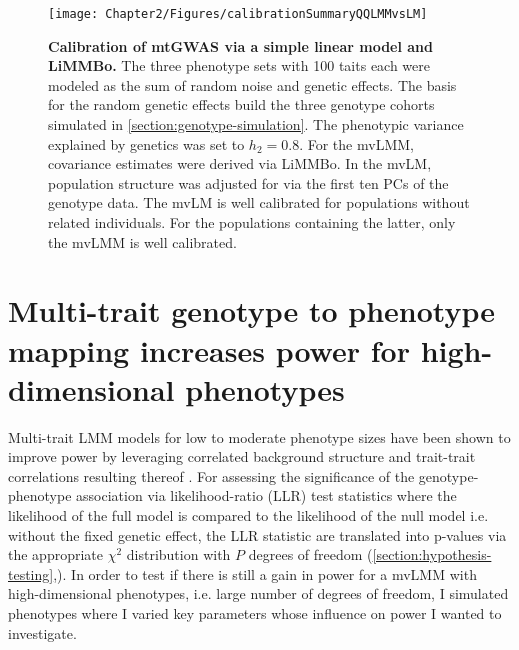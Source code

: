 \begin{figure}[hbtp]
	\centering	
	\texttt{[image: Chapter2/Figures/calibrationSummaryQQLMMvsLM]}\\
	\caption[\textbf{Calibration of mtGWAS via a simple linear model and a linear mixed model. }]{\textbf{Calibration of mtGWAS via a simple linear model and LiMMBo. } The three phenotype sets with \num{100} taits each were modeled as the sum of random noise and genetic effects. The basis for the random genetic effects build the three genotype cohorts simulated in \cref{section:genotype-simulation}. The phenotypic variance explained by genetics was set to \(h_2=0.8\). For the mvLMM,  covariance estimates were derived via LiMMBo. In the mvLM, population structure was adjusted for via the first ten PCs of the genotype data. The mvLM is well calibrated for populations without related individuals. For the populations containing the latter, only the mvLMM is well calibrated. }
	  \label{fig:calibration-LM}%
\end{figure}

\section{Multi-trait genotype to phenotype mapping increases power for high-dimensional phenotypes}
\label{section:power-limmbo}

Multi-trait LMM models for low to moderate phenotype sizes have been shown to improve power by leveraging correlated background structure and trait-trait correlations resulting thereof \cite{Casale2015}. For assessing the significance of the genotype-phenotype association via likelihood-ratio (LLR) test statistics where the likelihood of the full model is compared to the likelihood of the null model i.e. without the fixed genetic effect, the LLR statistic are translated into p-values via the appropriate \(\chi^2\) distribution with \(P\) degrees of freedom (\cref{section:hypothesis-testing},\cite{Wilks1938}).  In order to test if there is still a gain in power for a mvLMM with high-dimensional phenotypes, i.e. large number of degrees of freedom, I simulated phenotypes where I varied key parameters whose influence on power I wanted to investigate. 

